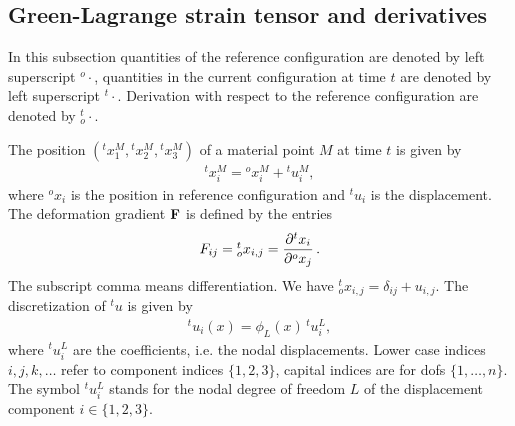 \subsection{Green-Lagrange strain tensor and derivatives}

In this subsection quantities of the reference configuration are denoted by left superscript ${}^o{\cdot}$, quantities in the current configuration at time $t$ are denoted by left superscript ${}^t{\cdot}$. Derivation with respect to the reference configuration are denoted by ${}^{t}_o{\cdot}$.

The position $({}^tx_1^M,{}^tx_2^M,{}^tx_3^M)$ of a material point $M$ at time $t$ is given by
\begin{equation*}
  \begin{array}{lll}
    {}^tx_i^M = {}^ox_i^M + {}^tu_i^M,
  \end{array}
\end{equation*}
where ${}^ox_i$ is the position in reference configuration and ${}^tu_i$ is the displacement. The deformation gradient $\textbf{F}$ is defined by the entries
\begin{equation*}
  \begin{array}{lll}
    F_{ij} = {}^t_ox_{i,j} = \p{{}^tx_i}{{}^ox_j}.
  \end{array}
\end{equation*}
The subscript comma means differentiation. We have ${}^t_ox_{i,j} = \delta_{ij} + u_{i,j}$. 
The discretization of $^{t}u$ is given by
\begin{equation*}
  \begin{array}{lll}
    {}^tu_i(x) = \phi_L(x)\,{}^tu_i^L,
  \end{array}
\end{equation*}
where ${}^tu_i^L$ are the coefficients, i.e. the nodal displacements. Lower case indices $i,j,k,\dots$ refer to component indices $\{1,2,3\}$, capital indices are for dofs $\{1,\dots,n\}$. 
The symbol ${}^tu_i^L$ stands for the nodal degree of freedom $L$ of the displacement component $i\in \{1,2,3\}$.

